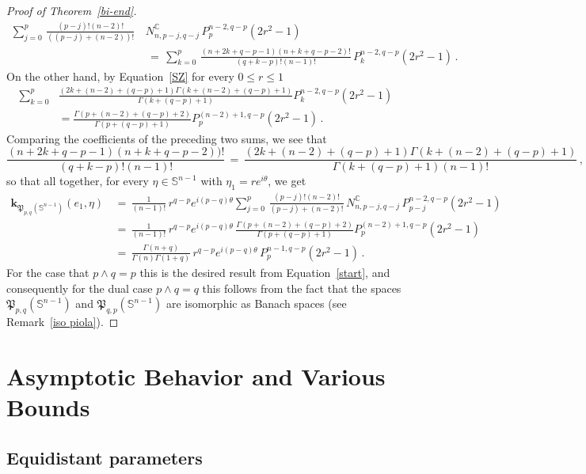 \documentclass[12pt]{amsart}
\numberwithin{subsection}{section}
\theoremstyle{definition}
\theoremstyle{remark}
\begin{document}
\begin{proof}[Proof of Theorem~\ref{bi-end}]
\begin{align*}
\sum_{j=0}^{p} \,
  \frac{(p-j)! (n-2)!}{((p-j)+(n-2))!}
 \,&
  N^\mathbb{C}_{n,p-j,q-j}
  \,P_{p}^{n-2,q-p}(2r^2 -1)
\\&
  \, =   \,
    \sum_{k=0}^{p} \,
     \frac{(n+2k +q-p-1)  (n+k +q-p-2)!}{(q+k-p)!(n-1)!}
      \,P_{k}^{n-2,q-p}(2r^2 -1)
    \,.
  \end{align*}
  On the other hand, by Equation~\eqref{SZ} for every  $0\leq r \leq 1  $
  \begin{align*}
        \sum_{k=0}^p & \frac{(2k+(n-2)+ (q-p) +1) \Gamma(k+(n-2)+ (q-p) +1)}
{\Gamma(k+ (q-p) +1)} P_{k}^{n-2, q-p}(2r^2 -1)
\\&
=
\frac{ \Gamma( p+(n-2)+ (q-p) +2)}{\Gamma(p+(q-p)+1)}
P_{p}^{(n-2)+1, q-p}(2r^2 -1)\,.
  \end{align*}
  Comparing the coefficients of the preceding two sums, we see that
  \[
  \frac{(n+2k +q-p-1)  (n+k +q-p-2))!}{(q+k-p)!(n-1)!} \,=\,\frac{(2k+(n-2)+ (q-p) +1) \Gamma(k+(n-2)+ (q-p) +1)}
{\Gamma(k+ (q-p) +1)(n-1)!}\,,
  \]
  so that all together, for every  $\eta \in \mathbb{S}^{n-1} $ with  $\eta_1 = r e^{i \theta}  $, we get
  \begin{align*}
        \mathbf{k}_{\mathfrak{P}_{p,q}(\mathbb{S}^{n-1})}(e_1, \eta) &\, =   \,
    \frac{1}{(n-1)!}\,
      r^{q-p}  e^{i(p-q)\theta} \sum_{j=0}^{p} \,
  \frac{(p-j)! (n-2)!}{(p-j)+(n-2)!}
 \,
  N^\mathbb{C}_{n,p-j,q-j}
  \,P_{p-j}^{n-2,q-p}(2r^2 -1)
  \\&
  \, =   \,
  \frac{1}{(n-1)!}\,
   r^{q-p}  e^{i(p-q)\theta} \,
\frac{ \Gamma( p+(n-2)+ (q-p) +2)}{\Gamma(p+(q-p)+1)}
P_{p}^{(n-2)+1, q-p}(2r^2 -1)
\\&
 \, =   \,
 \frac{\Gamma(n + q)}{\Gamma(n)\Gamma( 1 + q )}\,
   r^{q-p}  e^{i(p-q)\theta} \,P_{p}^{n-1, q-p}(2r^2 -1)\,.
  \end{align*}
  For the case that  $p\wedge q = p $ this is the desired result from Equation~\eqref{start}, and consequently for the dual case
  $p\wedge q = q $ this follows from the fact that the spaces  $\mathfrak{P}_{p,q}(\mathbb{S}^{n-1}) $ and  $\mathfrak{P}_{q,p}(\mathbb{S}^{n-1}) $
  are isomorphic as Banach spaces (see Remark~\ref{iso piola}).
  \end{proof}


\bigskip

\section{Asymptotic Behavior and Various Bounds}

\subsection{Equidistant parameters}
\end{document}
